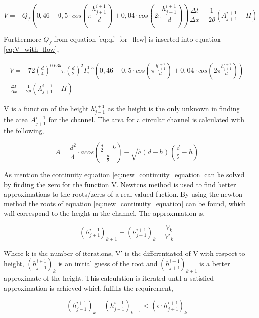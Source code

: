 \begin{equation}\label{eq:V_with_flow}
	V = -Q_f\left(0,46-0,5\cdot cos\left(\pi \frac{h_{j+1}^{i+1}}{d}\right)+0,04\cdot cos\left(2\pi\frac{h_{j+1}^{i+1}}{d}\right)\right)\frac{\Delta t}{\Delta x}-\frac{1}{2\theta}\left(A_{j+1}^{i+1}-H\right)
\end{equation}

Furthermore $Q_f$ from equation \ref{eq:qf_for_flow} is inserted into equation \ref{eq:V_with_flow},

\begin{multline}\label{eq:new_continuity_equation}
	V = -72\left(\frac{d}{4}\right)^{0.635}\pi\left(\frac{d}{2}\right)^2I_e^{0,5} \left(0,46-0,5\cdot cos\left(\pi \frac{h_{j+1}^{i+1}}{d}\right)+ 0,04\cdot cos\left(2\pi\frac{h_{j+1}^{i+1}}{d}\right)\right)\\ \frac{\Delta t}{\Delta x}-\frac{1}{2\theta}\left(A_{j+1}^{i+1}-H\right)
\end{multline}

V is a function of the height $h_{j+1}^{i+1}$ as the height is the only unknown in finding the area $A_{j+1}^{i+1}$ for the channel. The area for a circular channel is calculated with the following,

\begin{equation}\label{eq:calc_area_open_channel}
	A = \frac {d^2}{4} \cdot acos \left(\frac{\frac{d}{2}-h}{\frac{d}{2}}\right)-\sqrt{h (d-h)} \left(\frac{d}{2}-h\right)
\end{equation}

As mention the continuity equation \ref{eq:new_continuity_equation} can be solved by finding the zero for the function V. Newtons method is used to find better approximations to the roots/zeres of a real valued fuction. By using the newton method the roots of equation \ref{eq:new_continuity_equation} can be found, which will correspond to the height in the channel. The approximation is,

\begin{equation}
	 (h_{j+1}^{i+1})_{k+1} =(h_{j+1}^{i+1})_{k} - \frac{V_k}{V'_k}
\end{equation}

Where k is the number of iterations, V$'$ is the differentiated of V with respect to height, $(h_{j+1}^{i+1})_{k}$ is an initial guess of the root and $(h_{j+1}^{i+1})_{k+1}$ is a better approximate of the height. This calculation is iterated until a satisfied approximation is achieved which fulfills the requirement,

\begin{equation}
	\left(h_{j+1}^{i+1}\right)_{k}-(h_{j+1}^{i+1})_{k-1} < (\epsilon \cdot h_{j+1}^{i+1})_{k}
\end{equation}

